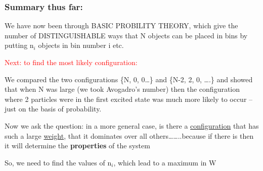 \documentclass[a4paper,12pt,titlepage]{article}
\begin{document}

\begin{frame}
\frametitle{Summary thus far:}
 
We have now been through BASIC PROBILITY THEORY, which give the number of DISTINGUISHABLE ways that N objects can be placed in bins by putting n\(_i\) objects in bin number i etc.
 
\textcolor{red}{Next: to find the most likely configuration:}
 
We compared the two configurations \{N, 0, 0…\} and  \{N-2, 2, 0, ….\} and showed that when N was large (we took Avogadro's number) then the configuration where 2 particles were in the first excited state was much more likely to occur -- just on the basis of probability.

Now we ask the question: in a more general case, is there a \underline{configuration} that has such a large \underline{weight}, that it dominates over all others……..because if there is then it will determine the \textbf{properties} of the system

So, we need to find the values of n\(_i\), which lead to a maximum in W
\end{frame}
\end{document}
